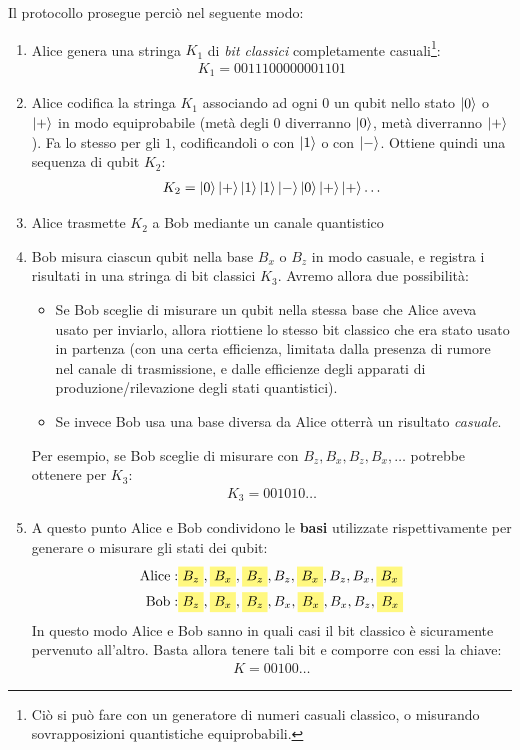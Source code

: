 \documentclass[../../InformazioneQuantistica.tex]{subfiles}
\begin{document}
Il protocollo prosegue perciò nel seguente modo:
\begin{enumerate}
\item Alice genera una stringa $K_1$ di \textit{bit classici} completamente casuali\footnote{Ciò si può fare con un generatore di numeri casuali classico, o misurando sovrapposizioni quantistiche equiprobabili.}:
\begin{align*}
K_1=0011100000001101
\end{align*}
\item Alice codifica la stringa $K_1$ associando ad ogni $0$ un qubit nello stato $\Ket{0}$ o $\Ket{+}$ in modo equiprobabile (metà degli $0$ diverranno $\Ket{0}$, metà diverranno $\Ket{+}$). Fa lo stesso per gli $1$, codificandoli o con $\Ket{1}$ o con $\Ket{-}$. Ottiene quindi una sequenza di qubit $K_2$:
\begin{align*}
K_2 =\Ket{0}\Ket{+}\Ket{1}\Ket{1}\Ket{-}\Ket{0}\Ket{+}\Ket{+}\dots
\end{align*}
\item Alice trasmette $K_2$ a Bob mediante un canale quantistico
\item Bob misura ciascun qubit nella base $B_x$ o $B_z$ in modo casuale, e registra i risultati in una stringa di bit classici $K_3$. Avremo allora due possibilità:
\begin{itemize}
\item Se Bob sceglie di misurare un qubit nella stessa base che Alice aveva usato per inviarlo, allora riottiene lo stesso bit classico che era stato usato in partenza (con una certa efficienza, limitata dalla presenza di rumore nel canale di trasmissione, e dalle efficienze degli apparati di produzione/rilevazione degli stati quantistici).
\item Se invece Bob usa una base diversa da Alice otterrà un risultato \textit{casuale}.
\end{itemize}
Per esempio, se Bob sceglie di misurare con $B_z, B_x, B_z, B_x, \dots$ potrebbe ottenere per $K_3$:
\begin{align*}
K_3 = 001010\dots
\end{align*}
\item A questo punto Alice e Bob condividono le \textbf{basi} utilizzate rispettivamente per generare o misurare gli stati dei qubit:
\begin{align*}
\text{Alice}: &\hlc{Yellow}{B_z}, \hlc{Yellow}{B_x}, \hlc{Yellow}{B_z}, B_z, \hlc{Yellow}{B_x}, B_z, B_x, \hlc{Yellow}{B_x}\\
\text{Bob}: &\hlc{Yellow}{B_z}, \hlc{Yellow}{B_x}, \hlc{Yellow}{B_z}, B_x, \hlc{Yellow}{B_x}, B_x, B_z, \hlc{Yellow}{B_x}
\end{align*}
In questo modo Alice e Bob sanno in quali casi il bit classico è sicuramente pervenuto all'altro. Basta allora tenere tali bit  e comporre con essi la chiave:
\begin{align*}
K =00100\dots
\end{align*}
\end{enumerate}
\end{document}
